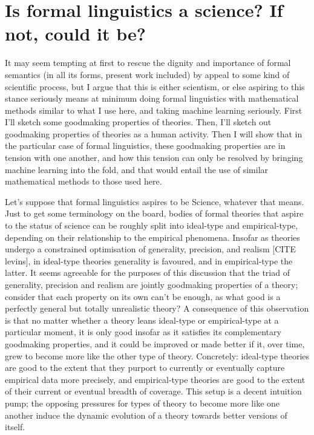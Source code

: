 \section{Is formal linguistics a science? If not, could it be?}

It may seem tempting at first to rescue the dignity and importance of formal semantics (in all its forms, present work included) by appeal to some kind of scientific process, but I argue that this is either scientism, or else aspiring to this stance seriously means at minimum doing formal linguistics with mathematical methods similar to what I use here, and taking machine learning seriously. First I'll sketch some goodmaking properties of theories. Then, I'll sketch out goodmaking properties of theories as a human activity. Then I will show that in the particular case of formal linguistics, these goodmaking properties are in tension with one another, and how this tension can only be resolved by bringing machine learning into the fold, and that would entail the use of similar mathematical methods to those used here.


Let's suppose that formal linguistics aspires to be Science, whatever that means. Just to get some terminology on the board, bodies of formal theories that aspire to the status of science can be roughly split into ideal-type and empirical-type, depending on their relationship to the empirical phenomena. Insofar as theories undergo a constrained optimisation of generality, precision, and realism [CITE levins], in ideal-type theories generality is favoured, and in empirical-type the latter. It seems agreeable for the purposes of this discussion that the triad of generality, precision and realism are jointly goodmaking properties of a theory; consider that each property on its own can't be enough, as what good is a perfectly general but totally unrealistic theory? A consequence of this observation is that no matter whether a theory leans ideal-type or empirical-type at a particular moment, it is only good insofar as it satisfies its complementary goodmaking properties, and it could be improved or made better if it, over time, grew to become more like the other type of theory. Concretely: ideal-type theories are good to the extent that they purport to currently or eventually capture empirical data more precisely, and empirical-type theories are good to the extent of their current or eventual breadth of coverage. This setup is a decent intuition pump; the opposing pressures for types of theory to become more like one another induce the dynamic evolution of a theory towards better versions of itself.

